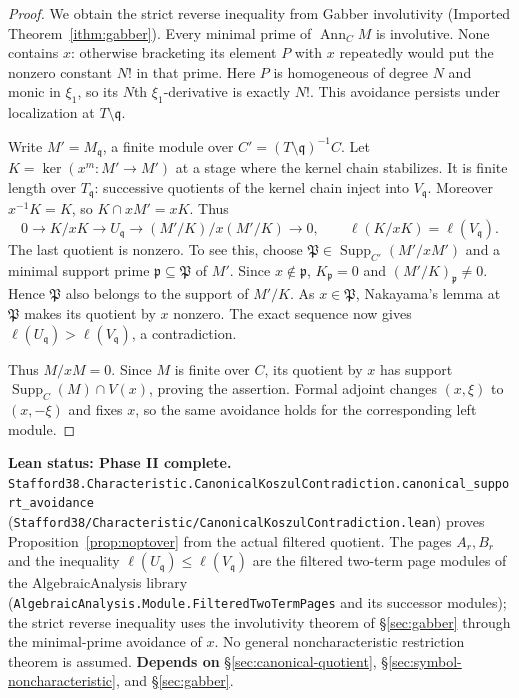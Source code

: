 \documentclass[11pt]{article}
\theoremstyle{plain}
\theoremstyle{definition}
\theoremstyle{remark}
\theoremstyle{plain}
\begin{document}
\begin{proof}
We obtain the strict reverse inequality from Gabber involutivity
(Imported Theorem~\ref{ithm:gabber}). Every minimal prime of
$\operatorname{Ann}_C M$ is involutive. None contains $x$: otherwise
bracketing its element $P$ with $x$ repeatedly would put the nonzero
constant $N!$ in that prime. Here $P$ is homogeneous of degree $N$ and
monic in $\xi_1$, so its $N$th $\xi_1$-derivative is exactly $N!$.
This avoidance persists under localization at $T\setminus\mathfrak q$.

Write $M'=M_{\mathfrak q}$, a finite module over
$C'=(T\setminus\mathfrak q)^{-1}C$. Let $K=\ker(x^m:M'\to M')$
at a stage where the kernel chain stabilizes. It is finite length over
$T_{\mathfrak q}$: successive quotients of the kernel chain inject into
$V_{\mathfrak q}$. Moreover $x^{-1}K=K$, so $K\cap xM'=xK$.
Thus
\[
 0\longrightarrow K/xK\longrightarrow U_{\mathfrak q}
 \longrightarrow (M'/K)/x(M'/K)\longrightarrow0,
 \qquad \ell(K/xK)=\ell(V_{\mathfrak q}).
\]
The last quotient is nonzero. To see this, choose
$\mathfrak P\in\operatorname{Supp}_{C'}(M'/xM')$ and a minimal support
prime $\mathfrak p\subseteq\mathfrak P$ of $M'$. Since $x\notin\mathfrak p$,
$K_{\mathfrak p}=0$ and $(M'/K)_{\mathfrak p}\ne0$. Hence
$\mathfrak P$ also belongs to the support of $M'/K$. As $x\in\mathfrak P$,
Nakayama's lemma at $\mathfrak P$ makes its quotient by $x$ nonzero.
The exact sequence now gives
$\ell(U_{\mathfrak q})>\ell(V_{\mathfrak q})$, a contradiction.

Thus $M/xM=0$. Since $M$ is finite over $C$, its quotient by $x$ has
support $\operatorname{Supp}_C(M)\cap V(x)$, proving the assertion.
Formal adjoint changes $(x,\xi)$ to $(x,-\xi)$ and fixes $x$, so the same
avoidance holds for the corresponding left module.
\end{proof}

\begin{provbox}
\textbf{Lean status: Phase II complete.}
\texttt{Stafford38.\allowbreak Characteristic.\allowbreak CanonicalKoszulContradiction.\allowbreak canonical\_support\_avoidance}
(\texttt{Stafford38/Characteristic/CanonicalKoszulContradiction.lean}) proves
Proposition~\ref{prop:noptover} from the actual filtered quotient. The pages
$A_r,B_r$ and the inequality $\ell(U_{\mathfrak q})\le\ell(V_{\mathfrak q})$
are the filtered two-term page modules of the AlgebraicAnalysis library
(\texttt{AlgebraicAnalysis.Module.FilteredTwoTermPages} and its successor
modules); the strict reverse inequality uses the involutivity theorem of
\S\ref{sec:gabber} through the minimal-prime avoidance of $x$. No general
noncharacteristic restriction theorem is assumed.
\textbf{Depends on} \S\ref{sec:canonical-quotient},
\S\ref{sec:symbol-noncharacteristic}, and \S\ref{sec:gabber}.
\end{provbox}
\end{document}
